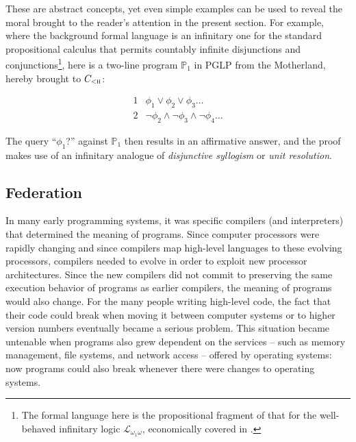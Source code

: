\documentclass[]{article}
\begin{document}
These are abstract concepts, yet even simple examples can be used to
reveal the moral brought to the reader's attention in the present
section.  For example, where the background formal language is an
infinitary one for the standard propositional calculus that permits
countably infinite disjunctions and conjunctions\footnote{The formal
	language here is the propositional fragment of that for the
	well-behaved infinitary logic $\mathscr{L}_{\omega_1 \omega}$,
	economically covered in \cite{ebb.flum.thomas.2nded}.}, here is a
two-line program $\mathbb{P}_1$ in PGLP from the Motherland, hereby
brought to $C_\textsc{<h}$:

\medskip
$$
\begin{array}{l|l}
1 &  \phi_1 \vee \phi_2 \vee \phi_3 \ldots\\
2 & \neg \phi_2 \wedge \neg \phi_3 \wedge \neg \phi_4 \ldots 
\end{array}
$$
\medskip

\noindent
%
The query ``$\phi_1$?'' against $\mathbb{P}_1$ then results in an
affirmative answer, and the proof makes use of an infinitary analogue
of \textit{disjunctive syllogism} or \textit{unit resolution}.


\subsection{Federation}


{\color{red}{this passage is inspired by Dale's note}}


In many early programming systems, it was specific compilers (and interpreters) that determined the meaning of programs. Since computer processors were rapidly changing and since compilers map high-level languages to these evolving processors, compilers needed to evolve in order to exploit new processor architectures. Since the new compilers did not commit to preserving the same execution behavior of programs
as earlier compilers, the meaning of programs would also change. For
the many people writing high-level code, the fact that their code
could break when moving it between computer systems or to higher
version numbers eventually became a serious problem. This situation
became untenable when programs also grew dependent on the
services -- such as memory management, file systems, and network
access -- offered by operating systems: now programs could also break
whenever there were changes to operating systems.
\end{document}
